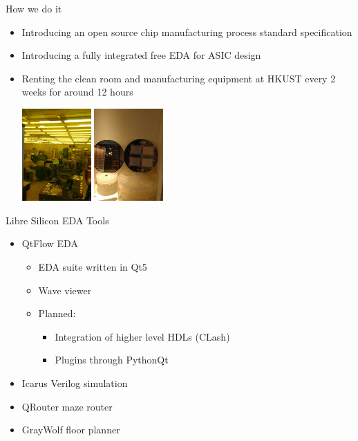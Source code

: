 \documentclass[9pt]{beamer}
\begin{document}
\begin{frame}{How we do it}
	\begin{itemize}
		\item Introducing an open source chip manufacturing process standard specification
		\item Introducing a fully integrated free EDA for ASIC design\footnotemark
		\item Renting the clean room and manufacturing equipment at HKUST every 2 weeks for around 12 hours \\		
		\begin{center}
			\includegraphics[height=100pt]{cleanroom.png}
			\includegraphics[height=100pt]{examples.png}
		\end{center}
	\end{itemize}

\end{frame}

\begin{frame}{Libre Silicon EDA Tools}
	\begin{itemize}
		\item QtFlow EDA\footnotemark
		\begin{itemize}
				\item EDA suite written in Qt5
				\item Wave viewer
				\item Planned:
				\begin{itemize}
					\item Integration of higher level HDLs (CLash)
					\item Plugins through PythonQt
				\end{itemize}
		\end{itemize}
		\item Icarus Verilog simulation\footnotemark
		\item QRouter maze router\footnotemark
		\item GrayWolf floor planner\footnotemark
	\end{itemize}

\end{frame}
\end{document}
